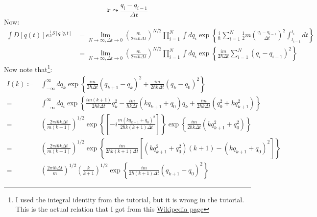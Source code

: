 \documentclass[12pt,a4]{article}
\begin{document}
\begin{enumerate}
\begin{equation*}
      \dot x \leadsto \frac{q_i - q_{i - 1}}{\Delta t}
    \end{equation*}
    Now:
    \begin{align*}
      \int D[q(t)] e^{\frac{i}{\hbar} S[q, \dot q, t]} &=\lim_{N \to \infty, \Delta t \to 0}\left(\frac{m}{2 \pi i \hbar \Delta t}\right)^{N / 2} \prod_{i = 1}^{N}\int dq_i \exp\left\{\frac{i}{\hbar}\sum_{i = 1}^{N}\frac{1}{2} m \left(\frac{q_i - q_{i - 1}}{\Delta t}\right)^2 \int_{t_{i-1}}^{t_i} dt \right\}\\
                                                       &=\lim_{N \to \infty, \Delta t \to 0}\left(\frac{m}{2 \pi i \hbar \Delta t}\right)^{N / 2} \prod_{i = 1}^{N}\int dq_i \exp\left\{\frac{im}{2\hbar\Delta t}\sum_{i = 1}^{N}\left(q_i - q_{i - 1}\right)^2 \right\}
    \end{align*}
    Now note that\footnote{I used the integral identity from the tutorial, but it is wrong in the tutorial. This is the actual relation that I got from this \href{https://en.wikipedia.org/wiki/Common_integrals_in_quantum_field_theory}{Wikipedia page}}:
    \begin{align*}
      I(k) \coloneqq&\int_{-\infty}^\infty dq_k \exp\left\{\frac{im}{2\hbar \Delta t}\left(q_{k+1} - q_{k}\right)^2 + \frac{im}{2\hbar k\Delta t}\left(q_{k} - q_{0}\right)^2\right\} \\
                                                                                                                        =& \int_{-\infty}^\infty dq_i \exp\left\{\frac{im(k + 1)}{2\hbar k \Delta t} q_{k}^2 -\frac{im}{\hbar k\Delta t} (kq_{k + 1} + q_{0}) q_k + \frac{im}{2\hbar k\Delta t} \left(q_{0}^2 + k q_{k + 1}^2\right) \right\}\\
                                                                                                                        =& \left(\frac{2 \pi i \hbar  k\Delta t}{ m (k + 1)}\right)^{1/2}\exp\left\{\left[-i \frac{m(kq_{k + 1} + q_{0})^2}{2\hbar k(k + 1)\Delta t} \right]\right\}  \exp\left\{\frac{im}{2\hbar k  \Delta t}\left(k q_{k + 1}^2 + q_{0}^2\right)\right\} \\
                                                                                                                        =& \left(\frac{2 \pi i \hbar  k\Delta t}{ m (k + 1)}\right)^{1/2}\exp\left\{\frac{im}{2 \hbar k (k + 1) \Delta t}\left[\left(k q_{k + 1}^2 + q_{0}^2\right)(k + 1) - (kq_{k + 1} + q_{0})^2 \right]\right\}\\
                                                                                                                        =& \left(\frac{2 \pi i \hbar  \Delta t}{ m }\right)^{1/2}\left(\frac{k}{k+1}\right)^{1/2}\exp\left\{\frac{im}{2 \hbar  (k + 1) \Delta t}\left(q_{k + 1} - q_{0}\right)^2\right\}

\end{align*}
\end{enumerate}
\end{document}
